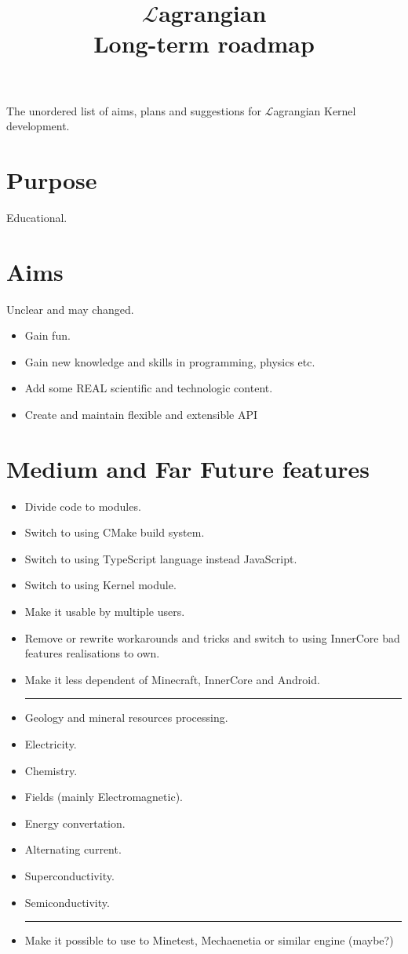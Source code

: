 \documentclass[12pt]{article}
\title{$\mathcal{L}$agrangian \\ Long-term roadmap}
\begin{document}
	\maketitle

	The unordered list of aims, plans and suggestions for $\mathcal{L}$agrangian Kernel development.

	\section{Purpose}
	Educational.
	\section{Aims}
	Unclear and may changed.
	\begin{itemize}
		\item Gain fun.
		\item Gain new knowledge and skills in programming, physics etc.
		\item Add some REAL scientific and technologic content.
		\item Create and maintain flexible and extensible API
	\end{itemize}

	\section{Medium and Far Future features}

	\begin{itemize}
		\item Divide code to modules.
		\item Switch to using CMake build system.
		\item Switch to using TypeScript language instead JavaScript.
		\item Switch to using Kernel module.
		\item Make it usable by multiple users.
		\item Remove or rewrite workarounds and tricks and switch to using InnerCore bad features realisations to own.
		\item Make it less dependent of Minecraft, InnerCore and Android. \\
		\noindent\rule{\textwidth}{0.4pt}
		\item Geology and mineral resources processing.
		\item Electricity.
		\item Chemistry.
		\item Fields (mainly Electromagnetic).
		\item Energy convertation.
		\item Alternating current.
		\item Superconductivity.
		\item Semiconductivity. \\
		\noindent\rule{\textwidth}{0.4pt}
		\item Make it possible to use to Minetest, Mechaenetia or similar engine (maybe?)
	\end{itemize}
\end{document}
